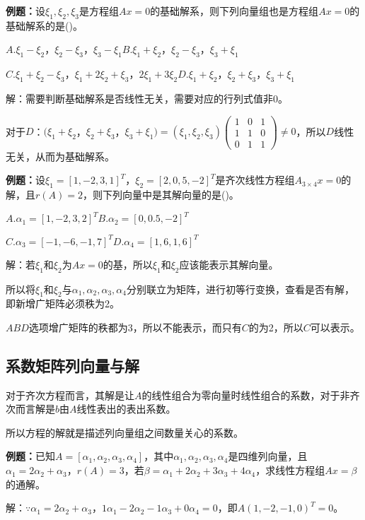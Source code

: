 \textbf{例题：}设$\xi_1,\xi_2,\xi_3$是方程组$Ax=0$的基础解系，则下列向量组也是方程组$Ax=0$的基础解系的是()。

$A.\xi_1-\xi_2$，$\xi_2-\xi_3$，$\xi_3-\xi_1$\qquad$B.\xi_1+\xi_2$，$\xi_2-\xi_3$，$\xi_3+\xi_1$

$C.\xi_1+\xi_2-\xi_3$，$\xi_1+2\xi_2+\xi_3$，$2\xi_1+3\xi_2$\qquad$D.\xi_1+\xi_2$，$\xi_2+\xi_3$，$\xi_3+\xi_1$

解：需要判断基础解系是否线性无关，需要对应的行列式值非0。\medskip

对于$D$：$(\xi_1+\xi_2$，$\xi_2+\xi_3$，$\xi_3+\xi_1)=(\xi_1,\xi_2,\xi_3)\left(\begin{array}{ccc}
    1 & 0 & 1 \\
    1 & 1 & 0 \\
    0 & 1 & 1
\end{array}\right)\neq0$，所以$D$线性无关，从而为基础解系。

\textbf{例题：}设$\xi_1=[1,-2,3,1]^T$，$\xi_2=[2,0,5,-2]^T$是齐次线性方程组$A_{3\times4}x=0$的解，且$r(A)=2$，则下列向量中是其解向量的是()。

$A.\alpha_1=[1,-2,3,2]^T$\qquad$B.\alpha_2=[0,0.5,-2]^T$

$C.\alpha_3=[-1,-6,-1,7]^T$\qquad$D.\alpha_4=[1,6,1,6]^T$

解：若$\xi_1$和$\xi_2$为$Ax=0$的基，所以$\xi_1$和$\xi_2$应该能表示其解向量。

所以将$\xi_1$和$\xi_2$与$\alpha_1,\alpha_2,\alpha_3,\alpha_4$分别联立为矩阵，进行初等行变换，查看是否有解，即新增广矩阵必须秩为2。

$ABD$选项增广矩阵的秩都为3，所以不能表示，而只有$C$的为2，所以$C$可以表示。

\subsection{系数矩阵列向量与解}

对于齐次方程而言，其解是让$A$的线性组合为零向量时线性组合的系数，对于非齐次而言解是$b$由$A$线性表出的表出系数。

所以方程的解就是描述列向量组之间数量关心的系数。

\textbf{例题：}已知$A=[\alpha_1,\alpha_2,\alpha_3,\alpha_4]$，其中$\alpha_1,\alpha_2,\alpha_3,\alpha_4$是四维列向量，且$\alpha_1=2\alpha_2+\alpha_3$，$r(A)=3$，若$\beta=\alpha_1+2\alpha_2+3\alpha_3+4\alpha_4$，求线性方程组$Ax=\beta$的通解。

解：$\because\alpha_1=2\alpha_2+\alpha_3$，$1\alpha_1-2\alpha_2-1\alpha_3+0\alpha_4=0$，即$A(1,-2,-1,0)^T=0$。

